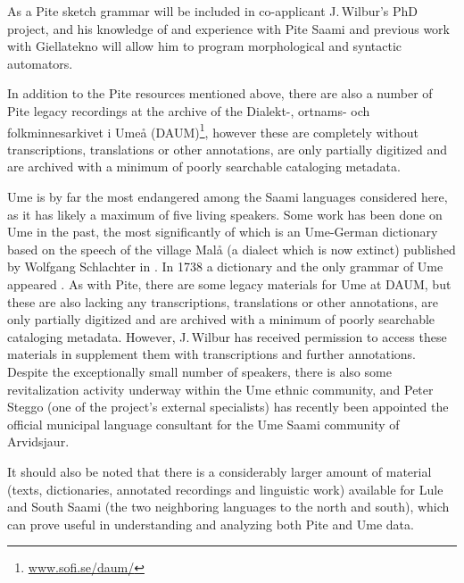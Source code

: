 \documentclass[a4paper,12pt]{article}
\begin{document}
As a Pite sketch grammar will be included in co-applicant J.\,Wilbur's PhD project, and his knowledge of and experience with Pite Saami and previous work with Giellatekno will allow him to program morphological and syntactic automators.

In addition to the Pite resources mentioned above, there are also a number of Pite legacy recordings at the archive of the Dialekt-, ortnams- och folkminnesarkivet i Umeå (DAUM)\footnote{\url{www.sofi.se/daum/}}, however these are completely without transcriptions, translations or other annotations, are only partially digitized and are archived with a minimum of poorly searchable cataloging metadata.

Ume is by far the most endangered among the Saami languages considered here, as it has likely a maximum of five living speakers. Some work has been done on Ume in the past, the most significantly of which is an Ume-German dictionary based on the speech of the village Malå (a dialect which is now extinct) published by Wolfgang Schlachter in \citeyear{schlachter1958}. In 1738 a dictionary and the only grammar of Ume appeared \cite{fjellstrom1738a,1738b}.
As with Pite, there are some legacy materials for Ume at DAUM, but these are also lacking any transcriptions, translations or other annotations, are only partially digitized and are archived with a minimum of poorly searchable cataloging metadata. However, J.\,Wilbur has received permission to access these materials in supplement them with transcriptions and further annotations.
Despite the exceptionally small number of speakers, there is also some revitalization activity underway within the Ume ethnic community, and Peter Steggo (one of the project's external specialists) has recently been appointed the official municipal language consultant for the Ume Saami community of Arvidsjaur.%

It should also be noted that there is a considerably larger amount of material (texts, dictionaries, annotated recordings and linguistic work)  available for Lule and South Saami (the two neighboring languages to the north and south), which can prove useful in understanding and analyzing both Pite and Ume data.
\end{document}
